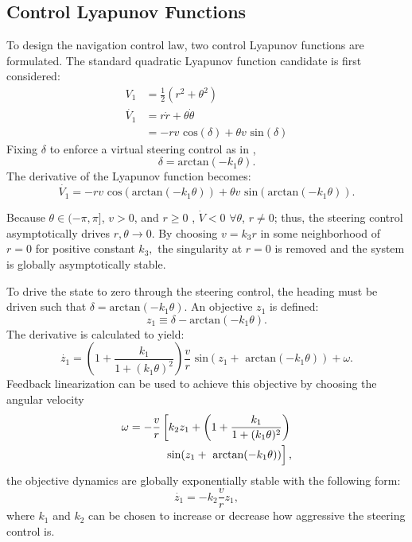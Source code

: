 \documentclass[conference]{IEEEtran}
\begin{document}
\subsection{Control Lyapunov Functions}
To design the navigation control law, two control Lyapunov functions are formulated. The standard quadratic Lyapunov function candidate is first considered:
\begin{align}
V_1&=\frac{1}{2}(r^2+\theta^2)\label{v1}\\
\dot{V_1}&=r \dot{r}+\theta \dot{\theta}\\
&=-r v \text{ cos}(\delta) + \theta v \text{ sin}(\delta)
\end{align}
Fixing $\delta$ to enforce a virtual steering control as in \cite{park2011}, 
\begin{equation} 
\delta = \text{arctan}(-k_1\theta). \end{equation}
The derivative of the Lyapunov function becomes:
\begin{equation}
\dot{V_1}=-r v \text{ cos}(\text{arctan}(-k_1\theta)) + \theta v \text{ sin}(\text{arctan}(-k_1\theta)).
\end{equation} 

Because $\theta\in (-\pi,\pi]$, $v>0$, and $r\geq 0$ , $\dot{V}<0$ $\forall \theta$, $r\neq0$; thus, the steering control asymptotically drives $r,\theta\to 0$. By choosing $v=k_3 r$ in some neighborhood of $r=0$ for positive constant $k_3,$ the singularity at $r=0$ is removed and the system is globally asymptotically stable.  

To drive the state to zero through the steering control, the heading must be driven such that $\delta = \text{arctan}(-k_1\theta).$ An objective $z_1$ is defined: 
\begin{equation}
z_1 \equiv \delta - \text{arctan}(-k_1\theta).
\label{z1}
\end{equation} The derivative is calculated to yield:
\begin{equation}
\dot{z_1}=\left( 1+\frac{k_1}{1+(k_1\theta)^2}\right) \frac{v}{r}\text{ sin}(z_1+\text{ arctan}(-k_1\theta))+\omega.
\end{equation}
Feedback linearization can be used to achieve this objective by choosing the angular velocity 
\begin{equation}
\begin{split}
\omega = -\frac{v}{r}\left[ k_2 z_1+\left( 1 + \frac{k_1}{1+(k_1\theta)^2} \right)\right.\\
\left. \vphantom{\frac{v}{r}} \text{sin}(z_1+\text{ arctan}(-k_1\theta))\right],
\end{split}
\end{equation}
the objective dynamics are globally exponentially stable with the following form: \begin{equation} \dot{z_1}=-k_2\frac{v}{r}z_1,\end{equation} where $k_1$ and $k_2$ can be chosen to increase or decrease how aggressive the steering control is.
\end{document}
